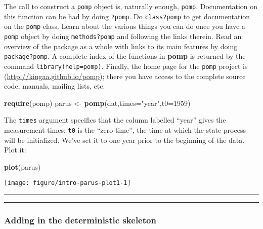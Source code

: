 \documentclass[]{article}
\newenvironment{Shaded}{\begin{snugshade}}{\end{snugshade}}
\newcommand{\KeywordTok}[1]{\textcolor[rgb]{0.13,0.29,0.53}{\textbf{#1}}}
\newcommand{\DataTypeTok}[1]{\textcolor[rgb]{0.13,0.29,0.53}{#1}}
\newcommand{\DecValTok}[1]{\textcolor[rgb]{0.00,0.00,0.81}{#1}}
\newcommand{\StringTok}[1]{\textcolor[rgb]{0.31,0.60,0.02}{#1}}
\newcommand{\NormalTok}[1]{#1}
\begin{document}
The call to construct a \texttt{pomp} object is, naturally enough,
\texttt{pomp}. Documentation on this function can be had by doing
\texttt{?pomp}. Do \texttt{class?pomp} to get documentation on the
\texttt{pomp} class. Learn about the various things you can do once you
have a \texttt{pomp} object by doing \texttt{methods?pomp} and following
the links therein. Read an overview of the package as a whole with links
to its main features by doing \texttt{package?pomp}. A complete index of
the functions in \textbf{pomp} is returned by the command
\texttt{library(help=pomp)}. Finally, the home page for the
\texttt{pomp} project is (\url{http://kingaa.github.io/pomp}); there you
have access to the complete source code, manuals, mailing lists, etc.

\begin{Shaded}
\begin{Highlighting}[]
\KeywordTok{require}\NormalTok{(pomp)}
\NormalTok{parus <-}\StringTok{ }\KeywordTok{pomp}\NormalTok{(dat,}\DataTypeTok{times=}\StringTok{"year"}\NormalTok{,}\DataTypeTok{t0=}\DecValTok{1959}\NormalTok{)}
\end{Highlighting}
\end{Shaded}

The \texttt{times} argument specifies that the column labelled ``year''
gives the measurement times; \texttt{t0} is the ``zero-time'', the time
at which the state process will be initialized. We've set it to one year
prior to the beginning of the data. Plot it:

\begin{Shaded}
\begin{Highlighting}[]
\KeywordTok{plot}\NormalTok{(parus)}
\end{Highlighting}
\end{Shaded}

\begin{center}\texttt{[image: figure/intro-parus-plot1-1]} \end{center}

\begin{center}\rule{0.5\linewidth}{\linethickness}\end{center}

\begin{center}\rule{0.5\linewidth}{\linethickness}\end{center}

\subsubsection{Adding in the deterministic
skeleton}\label{adding-in-the-deterministic-skeleton}
\end{document}
